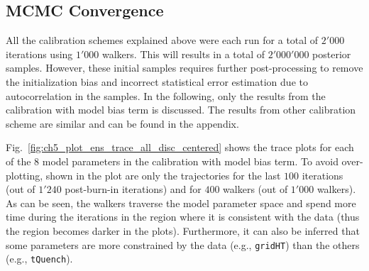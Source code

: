 \subsection{MCMC Convergence}\label{sub:bc_mcmc_convergence}

All the calibration schemes explained above were each run for a total of $2'000$ iterations using $1'000$ walkers. 
This will results in a total of $2'000'000$ posterior samples.
However, these initial samples requires further post-processing to remove the initialization bias and incorrect statistical error estimation due to autocorrelation in the samples.
In the following, only the results from the calibration with model bias term is discussed.
The results from other calibration scheme are similar and can be found in the appendix.

Fig.~\ref{fig:ch5_plot_ens_trace_all_disc_centered} shows the trace plots for each of the $8$ model parameters in the calibration with model bias term.
To avoid over-plotting, shown in the plot are only the trajectories for the last $100$ iterations (out of $1'240$ post-burn-in iterations) and for $400$ walkers (out of $1'000$ walkers). 
As can be seen, the walkers traverse the model parameter space and spend more time during the iterations in the region where it is consistent with the data (thus the region becomes darker in the plots).
Furthermore, it can also be inferred that some parameters are more constrained by the data (e.g., \texttt{gridHT}) than the others (e.g., \texttt{tQuench}).


